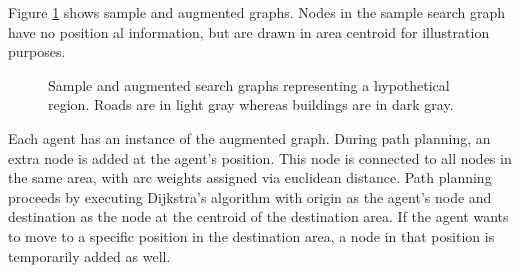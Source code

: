 %

Figure \ref{fig:graphs} shows sample and augmented graphs. Nodes in the sample search graph have no position al information, but are drawn in area centroid for illustration purposes. %

\begin{figure}[!ht]
  \centering
  \caption{Sample  and augmented  search graphs representing a hypothetical region. Roads are in light gray whereas buildings are in dark gray.}
  \label{fig:graphs}
\end{figure}

Each agent has an instance of the augmented graph. During path planning, an extra node is added at the agent's position. This node is connected to all nodes in the same area, with arc weights assigned via euclidean distance. Path planning proceeds by executing Dijkstra's algorithm with origin as the agent's node and destination as the node at the centroid of the destination area. If the agent wants to move to a specific position in the destination area, a node in that position is temporarily added as well.

